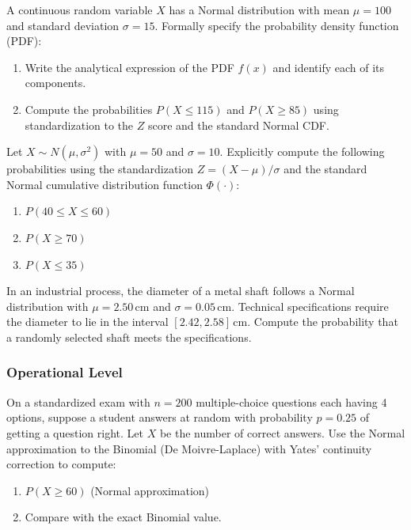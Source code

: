 \begin{problema}
	\label{prob:3.9.1}
	A continuous random variable $X$ has a Normal distribution with mean $\mu = 100$ and standard deviation $\sigma = 15$. Formally specify the probability density function (PDF):
	\begin{enumerate}
		\item Write the analytical expression of the PDF $f(x)$ and identify each of its components.
		\item Compute the probabilities $P(X \le 115)$ and $P(X \ge 85)$ using standardization to the $Z$ score and the standard Normal CDF.
	\end{enumerate}
\end{problema}

\begin{problema}
	\label{prob:3.9.2}
	Let $X \sim N(\mu, \sigma^{2})$ with $\mu = 50$ and $\sigma = 10$. Explicitly compute the following probabilities using the standardization $Z = (X - \mu)/\sigma$ and the standard Normal cumulative distribution function $\Phi(\cdot)$:
	\begin{enumerate}
		\item $P(40 \le X \le 60)$
		\item $P(X \ge 70)$
		\item $P(X \le 35)$
	\end{enumerate}
\end{problema}

\begin{problema}
	\label{prob:3.9.3}
	In an industrial process, the diameter of a metal shaft follows a Normal distribution with $\mu = 2.50\,\text{cm}$ and $\sigma = 0.05\,\text{cm}$. Technical specifications require the diameter to lie in the interval $[2.42, 2.58]\,\text{cm}$. Compute the probability that a randomly selected shaft meets the specifications.
\end{problema}

\subsubsection*{Operational Level}

\begin{problema}
	\label{prob:3.9.4}
	On a standardized exam with $n = 200$ multiple-choice questions each having 4 options, suppose a student answers at random with probability $p = 0.25$ of getting a question right. Let $X$ be the number of correct answers. Use the Normal approximation to the Binomial (De Moivre-Laplace) with Yates' continuity correction to compute:
	\begin{enumerate}
		\item $P(X \ge 60)$ (Normal approximation)
		\item Compare with the exact Binomial value.
	\end{enumerate}
\end{problema}

